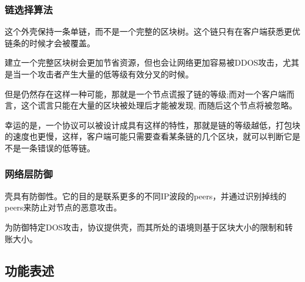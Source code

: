 \documentclass[letterpaper]{article}
\begin{document}
\subsubsection{链选择算法}
这个外壳保持一条单链，而不是一个完整的区块树。这个链只有在客户端获悉更优链条的时候才会被覆盖。

建立一个完整区块树会更加节省资源，但也会让网络更加容易被DDOS攻击，尤其是当一个攻击者产生大量的低等级有效分叉的时候。

但是仍然存在这样一种可能，那就是一个节点谎报了链的等级;而对一个客户端而言，这个谎言只能在大量的区块被处理后才能被发现, 而随后这个节点将被忽略。

幸运的是，一个协议可以被设计成具有这样的特性，那就是链的等级越低，打包块的速度也更慢，这样，客户端可能只需要查看某条链的几个区块，就可以判断它是不是一条错误的低等链。

\subsubsection{网络层防御}
壳具有防御性。它的目的是联系更多的不同IP波段的peers，并通过识别掉线的peers来防止对节点的恶意攻击。

为防御特定DOS攻击，协议提供壳，而其所处的语境则基于区块大小的限制和转账大小。
\subsection{功能表述}
\end{document}
